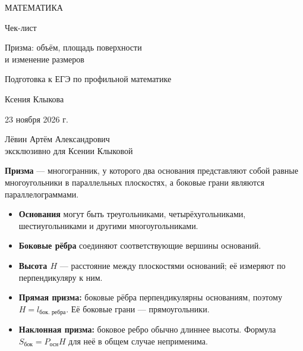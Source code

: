 \documentclass[a4paper,11pt]{article}
\newcommand{\slat}{S_{\text{бок}}}
\newcommand{\per}{P_{\text{осн}}}
\newcommand{\key}[1]{\textcolor{darkaccent}{\textbf{#1}}}
\newcommand{\sechead}[1]{\Needspace{9\baselineskip}\vspace{7pt}{\Large\color{darkaccent}\bfseries #1}\par\vspace{3pt}}
\begin{document}
\thispagestyle{empty}
\begin{center}
\vspace*{24mm}
{\Large\color{darkaccent}МАТЕМАТИКА}\par
\vspace{20mm}
{\Huge Чек-лист}\par
\vspace{11mm}
{\LARGE\color{accent}Призма: объём, площадь поверхности\\[3pt] и изменение размеров}\par
\vspace{17mm}
{\large Подготовка к ЕГЭ по профильной математике}\par
\vfill
{\Large Ксения Клыкова}\par
\vspace{12mm}
{\large 23 ноября 2026 г.}\par
\vspace{18mm}
{\normalsize Лёвин Артём Александрович\\[3pt]эксклюзивно для Ксении Клыковой}\par
\vspace{15mm}
\end{center}
\clearpage
\sechead{1. Что называется призмой}
\textbf{Призма} --- многогранник, у которого два основания представляют собой равные многоугольники в параллельных плоскостях, а боковые грани являются параллелограммами.
\begin{itemize}
 \item \key{Основания} могут быть треугольниками, четырёхугольниками, шестиугольниками и другими многоугольниками.
 \item \key{Боковые рёбра} соединяют соответствующие вершины оснований.
 \item \key{Высота \(H\)} --- расстояние между плоскостями оснований; её измеряют по перпендикуляру к ним.
 \item \key{Прямая призма:} боковые рёбра перпендикулярны основаниям, поэтому \(H=l_{\text{бок. ребра}}\). Её боковые грани --- прямоугольники.
 \item \key{Наклонная призма:} боковое ребро обычно длиннее высоты. Формула \(\slat=\per H\) для неё в общем случае неприменима.
\end{itemize}
\end{document}

